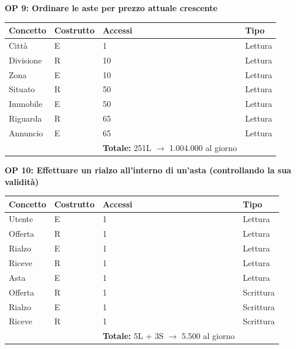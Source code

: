 \documentclass[a4paper,12pt]{report}
\begin{document}
            \textbf{OP 9: Ordinare le aste per prezzo attuale crescente}
        	\begin{table}[H]
            \centering
             \begin{tabular}{llll}
             \rowcolor{yellow!20} \textbf{Concetto} & \textbf{Costrutto} & \textbf{Accessi} & \textbf{Tipo}\\ [0.5ex] 
             \hline
             Città & E & 1 & Lettura \\ 
             Divisione & R & 10 & Lettura \\ 
             Zona & E & 10 & Lettura \\ 
             Situato & R & 50 & Lettura \\ 
             Immobile & E & 50 & Lettura \\ 
             Riguarda & R & 65 & Lettura \\ 
             Annuncio & E & 65 & Lettura \\ 
             \hline
                \rowcolor{yellow!20} &   & \textbf{Totale:} 251L $\rightarrow$ 1.004.000 al giorno &  \\ [1ex] 
             
             \end{tabular}
            \end{table}

            \textbf{OP 10: Effettuare un rialzo all’interno di un’asta (controllando la sua validità)} \\
        	\begin{table}[H]
            \centering
             \begin{tabular}{llll}
             \rowcolor{yellow!20} \textbf{Concetto} & \textbf{Costrutto} & \textbf{Accessi} & \textbf{Tipo}\\ [0.5ex] 
             \hline
             Utente & E & 1 & Lettura \\ 
             Offerta & R & 1 & Lettura \\ 
             Rialzo & E & 1 & Lettura \\ 
             Riceve & R & 1 & Lettura \\ 
             Asta & E & 1 & Lettura \\ 
             Offerta & R & 1 & Scrittura \\ 
             Rialzo & E & 1 & Scrittura \\ 
             Riceve & R & 1 & Scrittura \\ 
             \hline
                \rowcolor{yellow!20} &   & \textbf{Totale:} 5L + 3S $\rightarrow$ 5.500 al giorno &  \\ [1ex] 
             
             \end{tabular}
            \end{table}
\end{document}
